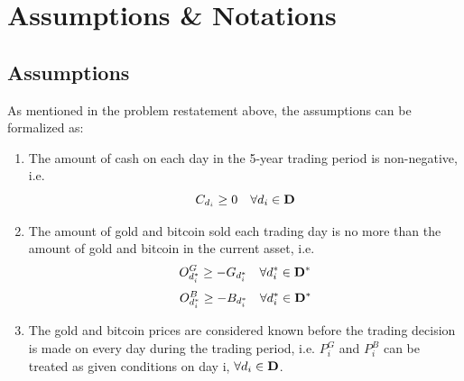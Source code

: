 \documentclass{mcmthesis}
\begin{document}

\section{Assumptions \& Notations}
\subsection{Assumptions}
As mentioned in the problem restatement above, the assumptions can be formalized as:
\begin{enumerate}
    \item The amount of cash on each day in the 5-year trading period is non-negative, i.e.
    \begin{equation}
        C_{d_i} \geq 0 \quad \forall d_i \in \bold{D}
    \end{equation}
    \item The amount of gold and bitcoin sold each trading day is no more than the amount of gold and bitcoin in the current asset, i.e.
    \begin{equation}
        O^G_{d_i^*} \geq -G_{d_i^*} \quad \forall d_i^* \in \bold{D^*}
    \end{equation}
    \begin{equation}
        O^B_{d_i^*} \geq -B_{d_i^*} \quad \forall d_i^* \in \bold{D^*}
    \end{equation}
    \item The gold and bitcoin prices are considered known before the trading decision is made on every day during the trading period, i.e. $P^G_i$ and $P^B_i$ can be treated as given conditions on day i, ${\forall d_i \in \bold{D}}$.
\end{enumerate}
\end{document}
